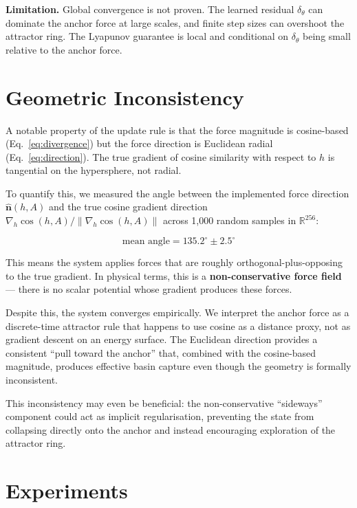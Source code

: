 \documentclass[11pt]{article}
\newcommand{\nhat}{\hat{\bm{n}}}
\newcommand{\R}{\mathbb{R}}
\begin{document}
\textbf{Limitation.} Global convergence is not proven. The learned
residual $\delta_\theta$ can dominate the anchor force at large scales,
and finite step sizes can overshoot the attractor ring. The Lyapunov
guarantee is local and conditional on $\delta_\theta$ being small
relative to the anchor force.

\section{Geometric Inconsistency}
\label{sec:geometry}

A notable property of the update rule is that the force magnitude is
cosine-based (Eq.~\ref{eq:divergence}) but the force direction is
Euclidean radial (Eq.~\ref{eq:direction}). The true gradient of cosine
similarity with respect to $h$ is tangential on the hypersphere, not
radial.

To quantify this, we measured the angle between the implemented force
direction $\nhat(h, A)$ and the true cosine gradient direction
$\nabla_h \cos(h, A) / \|\nabla_h \cos(h, A)\|$ across 1,000 random
samples in $\R^{256}$:

\begin{equation}
    \text{mean angle} = 135.2^{\circ} \pm 2.5^{\circ}
\end{equation}

This means the system applies forces that are roughly orthogonal-plus-opposing
to the true gradient. In physical terms, this is a \textbf{non-conservative
force field} --- there is no scalar potential whose gradient produces
these forces.

Despite this, the system converges empirically. We interpret the anchor
force as a discrete-time attractor rule that happens to use cosine as a
distance proxy, not as gradient descent on an energy surface. The
Euclidean direction provides a consistent ``pull toward the anchor''
that, combined with the cosine-based magnitude, produces effective basin
capture even though the geometry is formally inconsistent.

This inconsistency may even be beneficial: the non-conservative
``sideways'' component could act as implicit regularisation, preventing
the state from collapsing directly onto the anchor and instead
encouraging exploration of the attractor ring.

\section{Experiments}
\label{sec:experiments}
\end{document}
